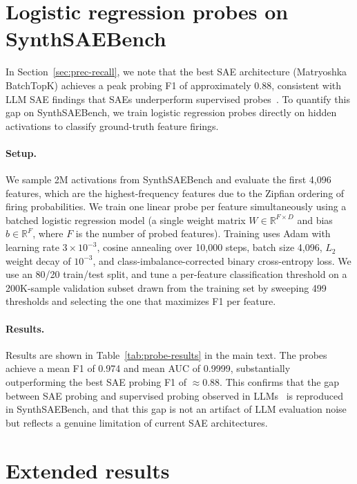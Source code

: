 \documentclass{article}
\theoremstyle{plain}
\theoremstyle{definition}
\theoremstyle{remark}
\begin{document}
\section{Logistic regression probes on SynthSAEBench}
\label{apx:probes}

In Section~\ref{sec:prec-recall}, we note that the best SAE architecture (Matryoshka BatchTopK) achieves a peak probing F1 of approximately 0.88, consistent with LLM SAE findings that SAEs underperform supervised probes~\citep{kantamneni2025sparse}. To quantify this gap on SynthSAEBench, we train logistic regression probes directly on hidden activations to classify ground-truth feature firings.

\paragraph{Setup.} We sample 2M activations from SynthSAEBench and evaluate the first 4,096 features, which are the highest-frequency features due to the Zipfian ordering of firing probabilities. We train one linear probe per feature simultaneously using a batched logistic regression model (a single weight matrix $W \in \mathbb{R}^{F \times D}$ and bias $b \in \mathbb{R}^F$, where $F$ is the number of probed features). Training uses Adam with learning rate $3 \times 10^{-3}$, cosine annealing over 10,000 steps, batch size 4,096, $L_2$ weight decay of $10^{-3}$, and class-imbalance-corrected binary cross-entropy loss. We use an 80/20 train/test split, and tune a per-feature classification threshold on a 200K-sample validation subset drawn from the training set by sweeping 499 thresholds and selecting the one that maximizes F1 per feature.

\paragraph{Results.} Results are shown in Table~\ref{tab:probe-results} in the main text. The probes achieve a mean F1 of 0.974 and mean AUC of 0.9999, substantially outperforming the best SAE probing F1 of $\approx$0.88. This confirms that the gap between SAE probing and supervised probing observed in LLMs~\citep{kantamneni2025sparse} is reproduced in SynthSAEBench, and that this gap is not an artifact of LLM evaluation noise but reflects a genuine limitation of current SAE architectures.

\section{Extended results}
\label{apx:extended}
\end{document}
